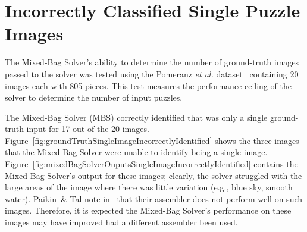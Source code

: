 \chapter{Incorrectly Classified Single Puzzle Images}\label{chap:incorreclyClassifiedSingleImages}

The Mixed-Bag Solver's ability to determine the number of ground-truth images passed to the solver was tested using the Pomeranz \textit{et al.} dataset~\cite{pomeranzBenchmarkImages} containing 20 images each with 805 pieces.  This test measures the performance ceiling of the solver to determine the number of input puzzles.  

The Mixed-Bag Solver (MBS) correctly identified that was only a single ground-truth input for 17 out of the 20 images.  Figure~\ref{fig:groundTruthSingleImageIncorrectlyIdentified} shows the three images that the Mixed-Bag Solver were unable to identify being a single image.  Figure~\ref{fig:mixedBagSolverOuputsSingleImageIncorrectlyIdentified} contains the Mixed-Bag Solver's output for these images; clearly, the solver struggled with the large areas of the image where there was little variation (e.g., blue sky, smooth water).  Paikin~\& Tal note in~\cite{paikin2015} that their assembler does not perform well on such images.  Therefore, it is expected the Mixed-Bag Solver's performance on these images may have improved had a different assembler been used.

